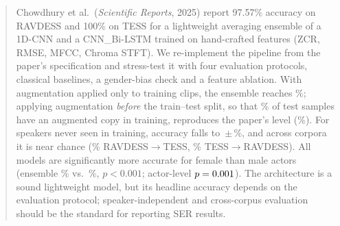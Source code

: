 \begin{abstract}
Chowdhury et al.\ (\emph{Scientific Reports}, 2025) report 97.57\% accuracy on RAVDESS and 100\% on TESS for a
lightweight averaging ensemble of a 1D-CNN and a CNN\_Bi-LSTM trained on hand-crafted features (ZCR, RMSE, MFCC,
Chroma STFT). We re-implement the pipeline from the paper's specification and stress-test it with four evaluation
protocols, classical baselines, a gender-bias check and a feature ablation. With augmentation applied only to
training clips, the ensemble reaches \AccPaperEns\%; applying augmentation \emph{before} the train--test split, so that
\LeakyOverlap\% of test samples have an augmented copy in training, reproduces the paper's level (\AccLeakyEns\%).
For speakers never seen in training, accuracy falls to \AccSpkEns\,$\pm$\,\AccStdSpkEns\%, and across corpora it is
near chance (\AccRTEns\% RAVDESS$\to$TESS, \AccTREns\% TESS$\to$RAVDESS). All models are significantly more accurate
for female than male actors (ensemble \GenderFemaleEns\% vs.\ \GenderMaleEns\%, $p<0.001$; actor-level
$p=\GenderActorP$). The architecture is a sound lightweight model, but its headline accuracy depends on the
evaluation protocol; speaker-independent and cross-corpus evaluation should be the standard for reporting SER results.
\end{abstract}
